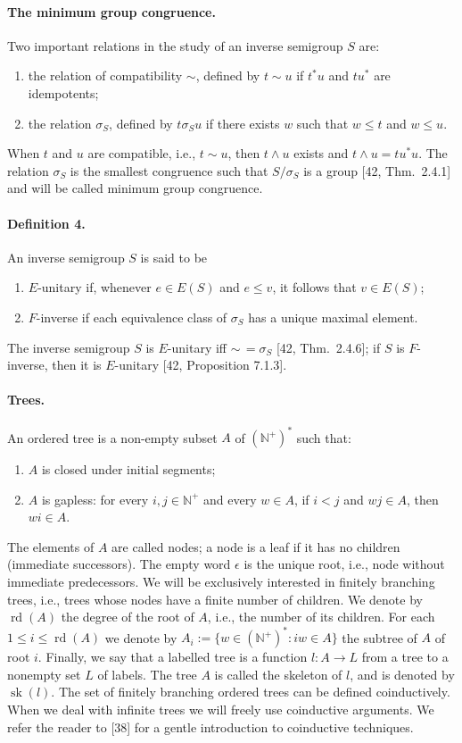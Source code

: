 \paragraph{The minimum group congruence.} Two important relations in the study of an inverse semigroup $S$ are:
\begin{enumerate}
\item the relation of compatibility $\sim$, defined by $t\sim u$ if $t^*u$ and $tu^*$ are idempotents;
\item the relation $\sigma_S$, defined by $t\mathrel{\sigma_S}u$ if there exists $w$ such that $w\le t$ and $w\le u$.
\end{enumerate}
When $t$ and $u$ are compatible, i.e., $t\sim u$, then $t\land u$ exists and $t\land u=tu^*u$. The relation $\sigma_S$ is the smallest congruence such that $S/\sigma_S$ is a group [42, Thm.\ 2.4.1] and will be called minimum group congruence.
\paragraph{Definition 4.} An inverse semigroup $S$ is said to be
\begin{enumerate}
\item $E$-unitary if, whenever $e\in E(S)$ and $e\le v$, it follows that $v\in E(S)$;
\item $F$-inverse if each equivalence class of $\sigma_S$ has a unique maximal element.
\end{enumerate}
The inverse semigroup $S$ is $E$-unitary iff $\sim\,=\sigma_S$ [42, Thm.\ 2.4.6]; if $S$ is $F$-inverse, then it is $E$-unitary [42, Proposition 7.1.3].
\paragraph{Trees.} An ordered tree is a non-empty subset $A$ of $(\mathbb N^+)^*$ such that:
\begin{enumerate}
\item[(i)] $A$ is closed under initial segments;
\item[(ii)] $A$ is gapless: for every $i,j\in\mathbb N^+$ and every $w\in A$, if $i<j$ and $wj\in A$, then $wi\in A$.
\end{enumerate}
The elements of $A$ are called nodes; a node is a leaf if it has no children (immediate successors).
The empty word $\epsilon$ is the unique root, i.e., node without immediate predecessors.
We will be exclusively interested in finitely branching trees, i.e., trees whose nodes have a finite number of children.
We denote by $\operatorname{rd}(A)$ the degree of the root of $A$, i.e., the number of its children.
For each $1\le i\le\operatorname{rd}(A)$ we denote by $A_i:=\{w\in(\mathbb N^+)^*:iw\in A\}$ the subtree of $A$ of root $i$.
Finally, we say that a labelled tree is a function $l:A\to L$ from a tree to a nonempty set $L$ of labels. The tree $A$ is called the skeleton of $l$, and is denoted by $\operatorname{sk}(l)$. The set of finitely branching ordered trees can be defined coinductively. When we deal with infinite trees we will freely use coinductive arguments. We refer the reader to [38] for a gentle introduction to coinductive techniques.

